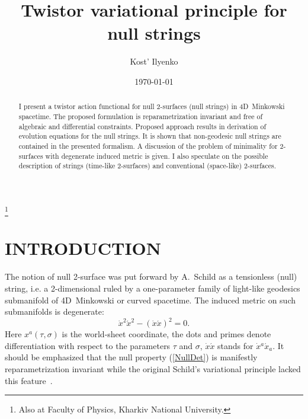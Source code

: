 \documentclass[a4paper,twocolumn,showkeys,showpacs,aps]{revtex4}
\begin{document}
\title{Twistor variational principle for null strings}
\author{Kost' Ilyenko}
 \thanks{Also at Faculty of Physics, Kharkiv National University.}%
%
\date{\today}%
\begin{abstract}
I present a twistor action functional for null 2-surfaces (null
strings) in 4D~Minkowski spacetime. The proposed formulation is
reparametrization  invariant and free of algebraic and
differential constraints. Proposed approach results in derivation
of evolution equations for the null strings. It is shown that
non-geodesic null strings are contained in the presented
formalism. A discussion of the problem of minimality for
2-surfaces with degenerate induced metric is given. I also
speculate on the possible description of strings (time-like
2-surfaces) and conventional (space-like) 2-surfaces.%
\end{abstract}
%
%
\maketitle

\section{INTRODUCTION}

The notion of null 2-surface was put forward by A.~Schild as a
tensionless (null) string, i.e. a 2-dimensional ruled by a
one-parameter family of light-like geodesics submanifold of
4D~Minkowski or curved spacetime. The induced metric on such
submanifolds is degenerate:
\begin{equation}
\dot{x}^2\acute{x}^2 - (\dot{x}\acute{x})^2 = 0.%
\label{NullDet}
\end{equation}
Here $x^a (\tau,\sigma)$ is the world-sheet coordinate, the dots
and primes denote differentiation with respect to the parameters
$\tau$ and $\sigma$, $\dot{x}\acute{x}$ stands for
$\dot{x}{}^a\acute{x}_a$. It should be emphasized that the null
property (\ref{NullDet}) is manifestly reparametrization invariant
while the original Schild's variational principle lacked this
feature~\cite{Schild}.
\end{document}
